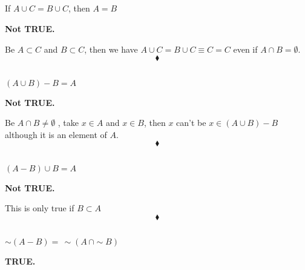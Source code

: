 \subsection{}
\begin{tcolorbox}
If $A\cup C=B\cup C$, then $A=B$
\end{tcolorbox}
\textbf{Not TRUE.}\\
\begin{figure}[H]%
    \centering
    \subfloat[$A\cup C=B\cup C\not\Rightarrow A=B$ ]{}
\label{fig:fig_p8b}
\end{figure}
Be $A\subset C$ and $B\subset C$, then we have $A\cup C=B\cup C\equiv C=C$ even if $A\cap B=\emptyset$.
$$\blacklozenge$$

\subsection{}
\begin{tcolorbox}
$(A\cup B)-B=A$
\end{tcolorbox}
\textbf{Not TRUE.}\\
\begin{figure}[H]%
    \centering
    \subfloat[$(A\cup B)-B\ne A$ ]{}
\label{fig:fig_p8b}
\end{figure}
Be $A\cap B\neq \emptyset$ , take  $x\in A$ and $x\in B$, then $x$ can't be $x\in (A\cup B)-B$ although it is an element of $A$.
$$\blacklozenge$$

\subsection{}
\begin{tcolorbox}
$(A- B)\cup B=A$
\end{tcolorbox}
\textbf{Not TRUE.}\\
\begin{figure}[H]%
    \centering
    \subfloat[$(A- B)\cup B\ne A$ ]{}
\label{fig:fig_p8b}
\end{figure}
This is only true if $B\subset A$
$$\blacklozenge$$


\subsection{}
\begin{tcolorbox}
$\sim(A-B)=\, \sim(A\, \cap \sim B)$
\end{tcolorbox}
\textbf{ TRUE.}\\

